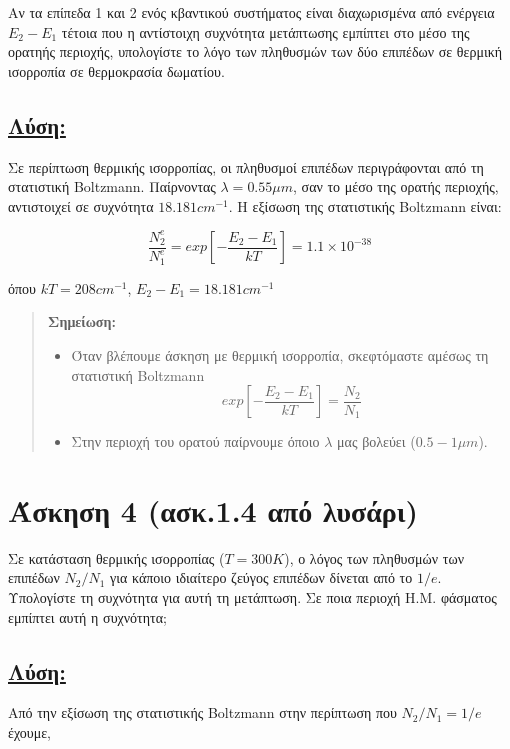\documentclass[a4paper,11pt,titlepage]{article}
\numberwithin{equation}{section} %
\begin{document}
Αν τα επίπεδα 1 και 2 ενός κβαντικού συστήματος είναι διαχωρισμένα από ενέργεια $E_2-E_1$ τέτοια που η αντίστοιχη συχνότητα μετάπτωσης εμπίπτει στο μέσο της ορατηής περιοχής, υπολογίστε το λόγο των πληθυσμών των δύο επιπέδων σε θερμική ισορροπία σε θερμοκρασία δωματίου.

\subsection*{\underline{Λύση:}}
Σε περίπτωση θερμικής ισορροπίας, οι πληθυσμοί επιπέδων περιγράφονται από τη στατιστική Boltzmann. Παίρνοντας $\lambda=0.55{\mu}m$, σαν το μέσο της ορατής περιοχής, αντιστοιχεί σε συχνότητα $18.181cm^{-1}$. Η εξίσωση της στατιστικής Boltzmann είναι:

\begin{equation}
\frac{N^e_2}{N^e_1}=exp[-\frac{E_2-E_1}{kT}]=1.1\times10^{-38}
\end{equation}

όπου $kT=208cm^{-1}$, $E_2-E_1=18.181cm^{-1}$

\begin{quote}
 \textbf{Σημείωση:} 
\begin{itemize}
 \item Όταν βλέπουμε άσκηση με θερμική ισορροπία, σκεφτόμαστε αμέσως τη στατιστική Boltzmann
\begin{equation}
exp[-\dfrac{E_2-E_1}{kT}]=\dfrac{N_2}{N_1}
\end{equation}
 \item Στην περιοχή του ορατού παίρνουμε όποιο $\lambda$ μας βολεύει ($0.5-1{\mu}m$).
\end{itemize}
\end{quote}

\newpage
\section{Άσκηση 4 (ασκ.1.4 από λυσάρι)}

Σε κατάσταση θερμικής ισορροπίας ($T=300K$), ο λόγος των πληθυσμών των επιπέδων $N_2/N_1$ για κάποιο ιδιαίτερο ζεύγος επιπέδων δίνεται από το $1/e$. Υπολογίστε τη συχνότητα για αυτή τη μετάπτωση. Σε ποια περιοχή Η.Μ. φάσματος εμπίπτει αυτή η συχνότητα;

\subsection*{\underline{Λύση:}}

Από την εξίσωση της στατιστικής Boltzmann στην περίπτωση που $N_2/N_1=1/e$ έχουμε,
\end{document}
